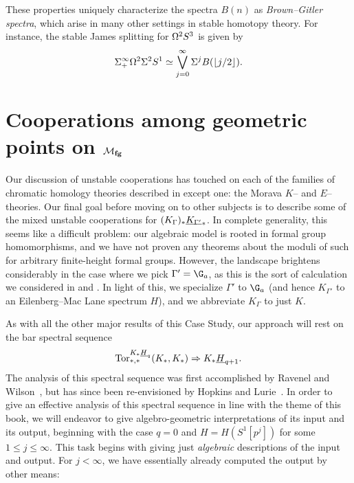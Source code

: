\begin{remark}
These properties uniquely characterize the spectra \(B(n)\) as \textit{Brown--Gitler spectra}, which arise in many other settings in stable homotopy theory.
For instance, the stable James splitting for \(\Omega^2 S^3\) is given by \[\Sigma^\infty_+ \Omega^2 \Sigma^2 S^1 \simeq \bigvee_{j=0}^\infty \Sigma^j B(\lfloor j/2 \rfloor).\]
\end{remark}










\section{Cooperations among geometric points on \texorpdfstring{\(\mathcal{M}_{\mathbf{fg}}\)}{Mfg}}\label{CoopnsForMoravaKandHA}


Our discussion of unstable cooperations has touched on each of the families of chromatic homology theories described in  except one: the Morava \(K\)-- and \(E\)--theories.
Our final goal before moving on to other subjects is to describe some of the mixed unstable cooperations for \((K_\Gamma)_* \OS{K_{\Gamma'}}{*}\).
In complete generality, this seems like a difficult problem: our algebraic model is rooted in formal group homomorphisms, and we have not proven any theorems about the moduli of such for arbitrary finite-height formal groups.
However, the landscape brightens considerably in the case where we pick \(\Gamma' = \G_a\), as this is the sort of calculation we considered in  and .
In light of this, we specialize \(\Gamma'\) to \(\G_a\) (and hence \(K_{\Gamma'}\) to an Eilenberg--Mac Lane spectrum \(H\)), and we abbreviate \(K_\Gamma\) to just \(K\).

As with all the other major results of this Case Study, our approach will rest on the bar spectral sequence \[\Tor^{K_* \OS{H}{q}}_{*, *}(K_*, K_*) \Rightarrow K_* \OS{H}{q+1}.\]
The analysis of this spectral sequence was first accomplished by Ravenel and Wilson~\cite{RavenelWilsonKthyOfEMSpaces}, but has since been re-envisioned by Hopkins and Lurie~\cite[Section 2]{HopkinsLurie}.
In order to give an effective analysis of this spectral sequence in line with the theme of this book, we will endeavor to give algebro-geometric interpretations of its input and its output, beginning with the case \(q = 0\) and \(H = H(S^1[p^j])\) for some \(1 \le j \le \infty\).
This task begins with giving just \emph{algebraic} descriptions of the input and output.
For \(j < \infty\), we have essentially already computed the output by other means:

